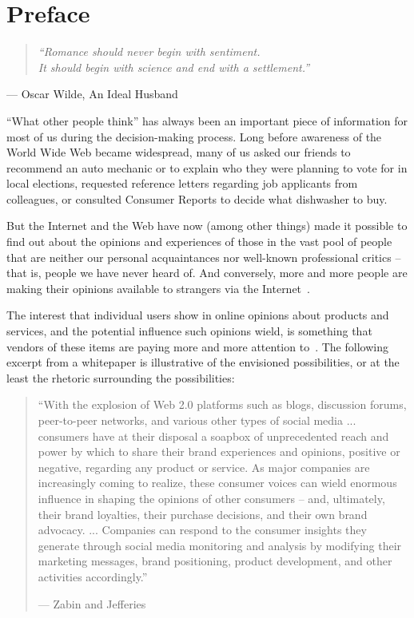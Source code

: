 \section{Preface}
\label{sec:preface}

\hfill

\begin{quote}
\centering
\textit{
``Romance should never begin with sentiment. \\
It should begin with science and end with a settlement.''
}
\end{quote}
\hfill --- Oscar Wilde, An Ideal Husband

\hfill

\hfill

``What other people think'' has always been an important piece of information
for most of us during the decision-making process.
Long before awareness of the World Wide Web became widespread,
many of us asked our friends to recommend an auto mechanic
or to explain who they were planning to vote for in local elections,
requested reference letters regarding job applicants from colleagues,
or consulted Consumer Reports to decide what dishwasher to buy.

But the Internet and the Web have now (among other things) made it possible
to find out about the opinions and experiences of those in the vast pool of people that are neither our personal acquaintances
nor well-known professional critics --
that is, people we have never heard of.
And conversely, more and more people are making their opinions available
to strangers via the Internet~\cite{PL08}.

The interest that individual users show in online opinions
about products and services,
and the potential influence such opinions wield,
is something that vendors of these items are paying more and more attention to~\cite{Hof08}.
The following excerpt from a whitepaper is illustrative
of the envisioned possibilities,
or at the least the rhetoric surrounding the possibilities:

\begin{quote}
``With the explosion of Web 2.0 platforms
such as blogs, discussion forums, peer-to-peer networks,
and various other types of social media ...
consumers have at their disposal a soapbox
of unprecedented reach and power
by which to share their brand experiences and opinions,
positive or negative, regarding any product or service.
As major companies are increasingly coming to realize,
these consumer voices can wield enormous influence
in shaping the opinions of other consumers --
and, ultimately, their brand loyalties, their purchase decisions,
and their own brand advocacy. ...
Companies can respond to the consumer insights they generate
through social media monitoring and analysis
by modifying their marketing messages, brand positioning, product development,
and other activities accordingly.''

\hfill --- Zabin and Jefferies~\cite{ZJ08}
\end{quote}

